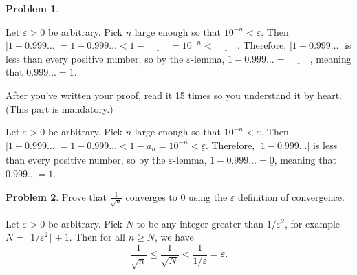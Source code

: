 \documentclass[11pt,oneside]{amsart}
\theoremstyle{definition}
\newtheorem{problem}{Problem}
\theoremstyle{plain}
\newcommand{\eps}{\varepsilon}
\begin{document}
\begin{problem}
\begin{enumerate}[(a)]
            Let $\eps>0$ be arbitrary. Pick $n$ large enough so that $10^{-n}<\eps$. Then $|1-0.999\ldots|=1-0.999\ldots<1-\underline{\hspace{1cm}}=10^{-n}<\underline{\hspace{1cm}}$. Therefore, $|1-0.999\ldots|$ is less than every positive number, so by the $\eps$-lemma, $1-0.999\ldots=\underline{\hspace{1cm}}$, meaning that $0.999\ldots=1$.

            After you've written your proof, read it 15 times so you understand it by heart. (This part is mandatory.)
            \begin{solution}
                Let $\eps>0$ be arbitrary. Pick $n$ large enough so that $10^{-n}<\eps$. Then $|1-0.999\ldots|=1-0.999\ldots<1-\underline{a_n}=10^{-n}<\underline{\eps}$. Therefore, $|1-0.999\ldots|$ is less than every positive number, so by the $\eps$-lemma, $1-0.999\ldots=\underline{0}$, meaning that $0.999\ldots=1$.
            \end{solution}
        \end{enumerate}
    \end{problem}

    \begin{problem}
        Prove that $\frac 1{\sqrt n}$ converges to 0 using the $\eps$ definition of convergence.
    \end{problem}
    \begin{solution}
        Let $\eps>0$ be arbitrary. Pick $N$ to be any integer greater than $1/\eps^2$, for example $N=\lfloor 1/\eps^2\rfloor+1$. Then for all $n\geq N$, we have
        \[\frac 1{\sqrt n}\leq\frac 1{\sqrt N}<\frac 1{1/\eps}=\eps.\]
    \end{solution}
\end{document}
